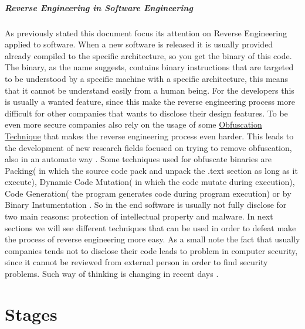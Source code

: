 \documentclass{article}
\begin{document}
\subparagraph{Reverse Engineering in Software Engineering}
As previously stated this document focus its attention on Reverse Engineering applied to software. When a new software is released it is usually provided already compiled to the specific architecture, so you get the binary of this code.
The binary, as the name suggests, contains binary instructions that are targeted to be understood by a specific machine with a specific architecture, this means that it cannot be understand easily from a human being.
For the developers this is usually a wanted feature, since this make the reverse engineering process more difficult for other companies that wants to disclose their design features.
To be even more secure companies also rely on the usage of some \underline{Obfuscation Technique} that makes the reverse engineering process even harder. This leads to the development of new research fields focused on trying to remove obfuscation, also in an automate way \citep{1566145}.
Some techniques used for obfuscate binaries are Packing( in which the source code pack and unpack the .text section as long as it execute)\citep{SlidePackers}, Dynamic Code Mutation( in which the code mutate during execution), Code Generation( the program generates code during program execution) or by Binary Instumentation \cite{paperInstrumentation}.
So in the end software is usually not fully disclose for two main reasons: protection of intellectual property and malware. In next sections we will see different techniques that can be used in order to defeat make the process of reverse engineering more easy.
As a small note the fact that usually companies tends not to disclose their code leads to problem in computer security, since it cannot be reviewed from external person in order to find security problems. Such way of thinking is changing in recent days \citep{articleOpensource}.

\section{Stages}
\end{document}
